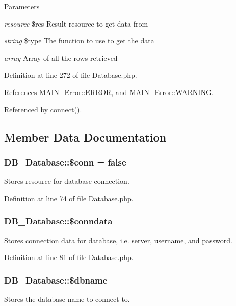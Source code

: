 \begin{DoxyParams}{Parameters}
\item[{\em resource}]\$res Result resource to get data from \item[{\em string}]\$type The function to use to get the data\item[{\em array}]Array of all the rows retrieved \end{DoxyParams}


Definition at line 272 of file Database.php.

References MAIN\_\-Error::ERROR, and MAIN\_\-Error::WARNING.

Referenced by connect().

\subsection{Member Data Documentation}
\hypertarget{classDB__Database_a8cc2ee198b44ecef38ffaaef255bee93}{
\subsubsection[{\$conn}]{\setlength{\rightskip}{0pt plus 5cm}DB\_\-Database::\$conn = false}}
\label{d3/d63/classDB__Database_a8cc2ee198b44ecef38ffaaef255bee93}
Stores resource for database connection. 

Definition at line 74 of file Database.php.\hypertarget{classDB__Database_a052600d78f57d7af178e13ab7992949a}{
\subsubsection[{\$conndata}]{\setlength{\rightskip}{0pt plus 5cm}DB\_\-Database::\$conndata}}
\label{d3/d63/classDB__Database_a052600d78f57d7af178e13ab7992949a}
Stores connection data for database, i.e. server, username, and password. 

Definition at line 81 of file Database.php.\hypertarget{classDB__Database_accd8f5296560fb4ce0cc8aa294b3951e}{
\subsubsection[{\$dbname}]{\setlength{\rightskip}{0pt plus 5cm}DB\_\-Database::\$dbname}}
\label{d3/d63/classDB__Database_accd8f5296560fb4ce0cc8aa294b3951e}
Stores the database name to connect to. 

